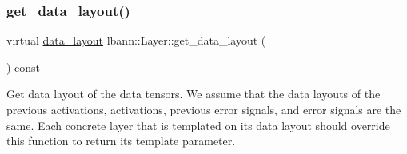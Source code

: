 \subsubsection{\texorpdfstring{get\+\_\+data\+\_\+layout()}{get\_data\_layout()}}
{\footnotesize\ttfamily virtual \hyperlink{base_8hpp_a786677cbfb3f5677b4d84f3056eb08db}{data\+\_\+layout} lbann\+::\+Layer\+::get\+\_\+data\+\_\+layout (\begin{DoxyParamCaption}{ }\end{DoxyParamCaption}) const\hspace{0.3cm}{\ttfamily [pure virtual]}}

Get data layout of the data tensors. We assume that the data layouts of the previous activations, activations, previous error signals, and error signals are the same. Each concrete layer that is templated on its data layout should override this function to return its template parameter. 

